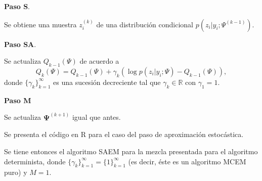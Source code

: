 \documentclass[
]{article}
\newenvironment{Shaded}{\begin{snugshade}}{\end{snugshade}}
\newcommand{\AttributeTok}[1]{\textcolor[rgb]{0.77,0.63,0.00}{#1}}
\newcommand{\ControlFlowTok}[1]{\textcolor[rgb]{0.13,0.29,0.53}{\textbf{#1}}}
\newcommand{\FunctionTok}[1]{\textcolor[rgb]{0.00,0.00,0.00}{#1}}
\newcommand{\NormalTok}[1]{#1}
\newcommand{\OtherTok}[1]{\textcolor[rgb]{0.56,0.35,0.01}{#1}}
\newcommand{\SpecialCharTok}[1]{\textcolor[rgb]{0.00,0.00,0.00}{#1}}
\begin{document}
\textbf{Paso S}.

Se obtiene una muestra \(z_i^{(k)}\) de una distribución condicional
\(p(z_i | y_i;\Psi^{(k-1)})\).

\textbf{Paso SA}.

Se actualiza \(Q_{k-1}(\Psi)\) de acuerdo a
\[ Q_k(\Psi)=Q_{k-1}(\Psi)+\gamma_{k}(\log p(z_i | y_i;\Psi)-Q_{k-1}(\Psi)),\]
donde \(\{\gamma_k\}_{k=1}^{\infty}\) es una sucesión decreciente tal
que \(\gamma_k \in \mathbb{R}\) con \(\gamma_1=1\).

\textbf{Paso M}

Se actualiza \(\bm{\Psi}^{(k+1)}\) igual que antes.

Se presenta el código en R para el caso del paso de aproximación
estocástica.

\begin{Shaded}
\end{Shaded}

Se tiene entonces el algoritmo SAEM para la mezcla presentada para el
algoritmo determinista, donde
\(\{ \gamma_k \}_{k=1}^{\infty}=\{1 \}_{k=1}^{\infty}\) (es decir, éste
es un algoritmo MCEM puro) y \(M=1\).
\end{document}
